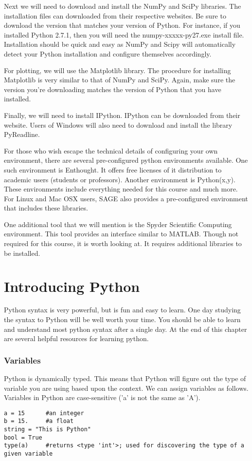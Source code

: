 Next we will need to download and install the NumPy and SciPy libraries.  The installation files can downloaded from their respective websites.  Be sure to download the version that matches your version of Python.  For instance, if you installed Python 2.7.1, then you will need the numpy-xxxxx-py27.exe install file.  Installation should be quick and easy as NumPy and Scipy will automatically detect your Python installation and configure themselves accordingly.

For plotting, we will use the Matplotlib library.  The procedure for installing Matplotlib is very similar to that of NumPy and SciPy.  Again, make sure the version you're downloading matches the version of Python that you have installed.

Finally, we will need to install IPython.  IPython can be downloaded from their website.  Users of Windows will also need to download and install the library PyReadline.

For those who wish escape the technical details of configuring your own environment, there are several pre-configured python environments available.  One such environment is Enthought.  It offers free licenses of it distribution to academic users (students or professors).  Another environment is Python(x,y).  These environments include everything needed for this course and much more.  For Linux and Mac OSX users, SAGE also provides a pre-configured environment that includes these libraries.

One additional tool that we will mention is the Spyder Scientific Computing environment.  This tool provides an interface similar to MATLAB.  Though not required for this course, it is worth looking at.  It requires additional libraries to be installed.

\section*{Introducing Python}
Python syntax is very powerful, but is fun and easy to learn.  One day studying the syntax to Python will be well worth your time.  You should be able to learn and understand most python syntax after a single day.  At the end of this chapter are several helpful resources for learning python.

\subsubsection*{Variables}
Python is dynamically typed.  This means that Python will figure out the type of variable you are using based upon the context.  We can assign variables as follows.  Variables in Python are case-sensitive ('a' is not the same as 'A').
\begin{lstlisting}
a = 15		#an integer
b = 15.		#a float
string = "This is Python"
bool = True
type(a)		#returns <type 'int'>; used for discovering the type of a given variable
\end{lstlisting}

